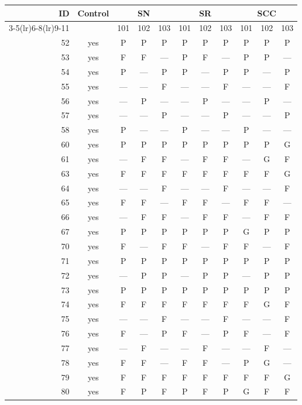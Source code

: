 \begin{table}[p]\centering\small
\begin{tabular*}{\textwidth}{@{\extracolsep{\fill}}rc*{9}{c}@{}}\toprule
ID & Control & \multicolumn{3}{c}{SN} & \multicolumn{3}{c}{SR} & \multicolumn{3}{c}{SCC}\\
\cmidrule(lr){3-5}\cmidrule(lr){6-8}\cmidrule(lr){9-11}
 & & 101 & 102 & 103 & 101 & 102 & 103 & 101 & 102 & 103\\\midrule
52 & yes & P & P & P & P & P & P & P & P & P\\
53 & yes & F & F & — & P & F & — & P & P & —\\
54 & yes & P & — & P & P & — & P & P & — & P\\
55 & yes & — & — & F & — & — & F & — & — & F\\
56 & yes & — & P & — & — & P & — & — & P & —\\
57 & yes & — & — & P & — & — & P & — & — & P\\
58 & yes & P & — & — & P & — & — & P & — & —\\
60 & yes & P & P & P & P & P & P & P & P & G\\
61 & yes & — & F & F & — & F & F & — & G & F\\
63 & yes & F & F & F & F & F & F & F & F & G\\
64 & yes & — & — & F & — & — & F & — & — & F\\
65 & yes & F & F & — & F & F & — & F & F & —\\
66 & yes & — & F & F & — & F & F & — & F & F\\
67 & yes & P & P & P & P & P & P & G & P & P\\
70 & yes & F & — & F & F & — & F & F & — & F\\
71 & yes & P & P & P & P & P & P & P & P & P\\
72 & yes & — & P & P & — & P & P & — & P & P\\
73 & yes & P & P & P & P & P & P & P & P & P\\
74 & yes & F & F & F & F & F & F & F & G & F\\
75 & yes & — & — & F & — & — & F & — & — & F\\
76 & yes & F & — & P & F & — & P & F & — & F\\
77 & yes & — & F & — & — & F & — & — & F & —\\
78 & yes & F & F & — & F & F & — & P & G & —\\
79 & yes & F & F & F & F & F & F & F & F & G\\
80 & yes & F & P & F & P & F & P & G & F & F\\

\end{tabular*}
\end{table}
